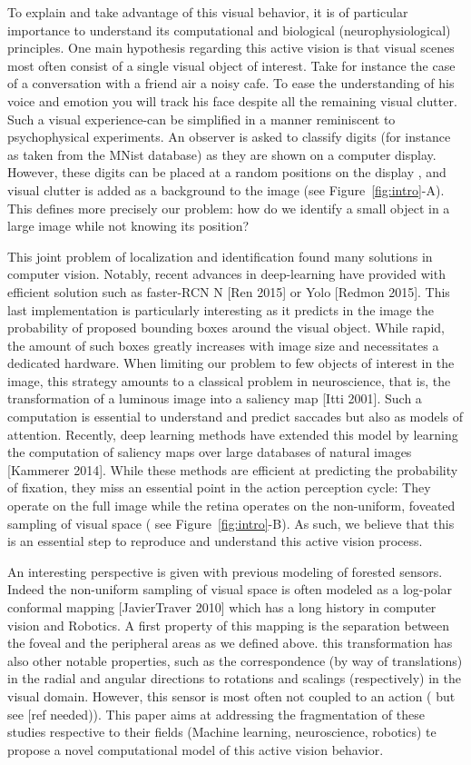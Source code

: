 To explain and take advantage of this visual behavior, it is of particular importance to understand its computational and biological (neurophysiological) principles. One main hypothesis regarding this active vision is that visual scenes most often consist of a single visual object of interest. Take for instance the case of a conversation with a friend air a noisy cafe. To ease the understanding of his voice and emotion you will track his face despite all the remaining visual clutter. Such a visual experience-can be simplified in a manner reminiscent to psychophysical experiments. An observer is asked to classify digits (for instance as taken from the MNist database) as they are shown on a computer display. However, these digits can be placed at a random positions on the display , and visual clutter is added as a background to the image (see Figure~\ref{fig:intro}-A). This defines more precisely our problem: how do we identify a small object in a large image while not knowing its position?
 
This joint problem of localization and identification found many solutions in computer vision. Notably, recent advances in deep-learning have provided with efficient solution such as faster-RCN N [Ren 2015] or Yolo [Redmon 2015]. This last implementation is particularly interesting as it predicts in the image the probability of proposed bounding boxes around the visual object. While rapid, the amount of such boxes greatly increases with image size and necessitates a dedicated hardware. When limiting our problem to few objects of interest in the image, this strategy amounts to a classical problem in neuroscience, that is, the transformation of a luminous image into a saliency map [Itti 2001]. Such a computation is essential to understand and predict saccades but also as models of attention. Recently, deep learning methods have extended this  model by learning the computation of saliency maps over large databases of natural images [Kammerer 2014]. While these methods are efficient at predicting the probability of fixation, they miss an essential point in the action perception cycle: They operate on the full image while the
retina operates on the non-uniform, foveated sampling of visual space ( see Figure~\ref{fig:intro}-B). As such, we believe that this is an essential step to reproduce and understand this active vision process.
 
An interesting perspective is given with previous modeling of forested sensors. Indeed the non-uniform sampling of visual space is often modeled as a log-polar conformal mapping [JavierTraver 2010] which has a long history in computer vision and Robotics. A first property of this mapping is the separation between the foveal and the peripheral areas as we defined above. this transformation has also other notable properties, such as the correspondence (by way of translations) in the radial and angular directions to rotations and scalings (respectively) in the visual domain. However, this sensor is most often not coupled to an action ( but see [ref needed)). This paper aims at addressing the fragmentation of these studies respective to their fields (Machine learning, neuroscience, robotics) te propose a novel computational model of this active vision behavior.
 
